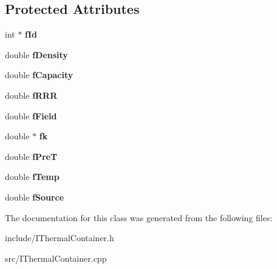 \subsection*{Protected Attributes}
\begin{DoxyCompactItemize}
\item 
\hypertarget{class_i_thermal_container_a481ec5695833214ea2a20d2ff5ab8694}{}int $\ast$ {\bfseries f\+Id}\label{class_i_thermal_container_a481ec5695833214ea2a20d2ff5ab8694}

\item 
\hypertarget{class_i_thermal_container_a2e926cb0faf6e3f1b63af7180bb40af8}{}double {\bfseries f\+Density}\label{class_i_thermal_container_a2e926cb0faf6e3f1b63af7180bb40af8}

\item 
\hypertarget{class_i_thermal_container_abe0b26a583e19aa494acb20030ba12ac}{}double {\bfseries f\+Capacity}\label{class_i_thermal_container_abe0b26a583e19aa494acb20030ba12ac}

\item 
\hypertarget{class_i_thermal_container_a36c687d4ad7f4c49ca09e4a88aebf746}{}double {\bfseries f\+R\+R\+R}\label{class_i_thermal_container_a36c687d4ad7f4c49ca09e4a88aebf746}

\item 
\hypertarget{class_i_thermal_container_a63be2bf93d746e607a99d804739e98ee}{}double {\bfseries f\+Field}\label{class_i_thermal_container_a63be2bf93d746e607a99d804739e98ee}

\item 
\hypertarget{class_i_thermal_container_a14b936827b0fc68872a24968745a5aa5}{}double $\ast$ {\bfseries fk}\label{class_i_thermal_container_a14b936827b0fc68872a24968745a5aa5}

\item 
\hypertarget{class_i_thermal_container_ab151e4861fd489c6440fee2c3a8d2790}{}double {\bfseries f\+Pre\+T}\label{class_i_thermal_container_ab151e4861fd489c6440fee2c3a8d2790}

\item 
\hypertarget{class_i_thermal_container_a2c889d31ce31ebd05c7aa8aaa670c2f7}{}double {\bfseries f\+Temp}\label{class_i_thermal_container_a2c889d31ce31ebd05c7aa8aaa670c2f7}

\item 
\hypertarget{class_i_thermal_container_a82a979a94082097bf94410f3dcd412b6}{}double {\bfseries f\+Source}\label{class_i_thermal_container_a82a979a94082097bf94410f3dcd412b6}

\end{DoxyCompactItemize}


The documentation for this class was generated from the following files\+:\begin{DoxyCompactItemize}
\item 
include/I\+Thermal\+Container.\+h\item 
src/I\+Thermal\+Container.\+cpp\end{DoxyCompactItemize}
